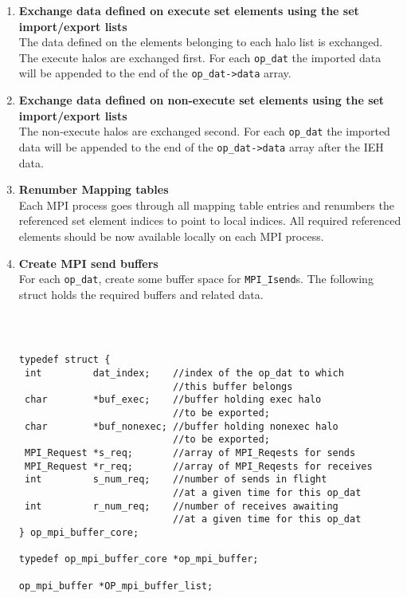 \documentclass[12pt]{article}
\begin{document}
\begin{enumerate}
\item \textbf{Exchange data defined on execute set elements using the set import/export lists}\\
The data defined on the elements belonging to each halo list is exchanged. The execute halos are exchanged first.
For each \texttt{op\_dat} the imported data will be appended to the end of the \texttt{op\_dat->data} array.

\item \textbf{Exchange data defined on non-execute set elements using the set import/export lists}\\
The non-execute halos are exchanged second. For each \texttt{op\_dat} the imported data will be appended to the end of
the \texttt{op\_dat->data} array after the IEH data. 

\item \textbf{Renumber Mapping tables}\\
Each MPI process goes through all mapping table entries and renumbers the referenced set element indices to point
to local indices. All required referenced elements should be now available locally on each MPI process. 

\item \textbf{Create MPI send buffers}\\
For each \texttt{op\_dat}, create some buffer space for \texttt{MPI\_Isend}s. The following struct holds the required
buffers and related data. 
\begin{verbatim}



typedef struct {
 int         dat_index;    //index of the op_dat to which 
                           //this buffer belongs
 char        *buf_exec;    //buffer holding exec halo 
                           //to be exported;
 char        *buf_nonexec; //buffer holding nonexec halo 
                           //to be exported;
 MPI_Request *s_req;       //array of MPI_Reqests for sends
 MPI_Request *r_req;       //array of MPI_Reqests for receives
 int         s_num_req;    //number of sends in flight 
                           //at a given time for this op_dat
 int         r_num_req;    //number of receives awaiting 
                           //at a given time for this op_dat
} op_mpi_buffer_core;

typedef op_mpi_buffer_core *op_mpi_buffer;

op_mpi_buffer *OP_mpi_buffer_list;
\end{verbatim}


\end{enumerate}
\end{document}
